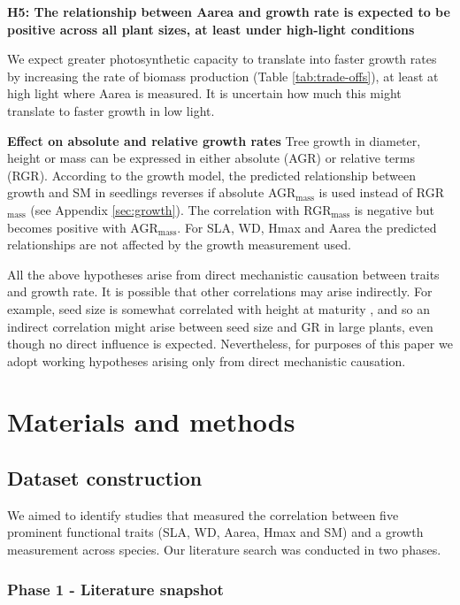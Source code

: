 \documentclass[a4paper,11pt]{article}
\begin{document}
\textbf{H5: The relationship between Aarea and growth rate is expected to be positive across all plant sizes, at least under high-light conditions}

We expect greater photosynthetic capacity to translate into faster growth rates by increasing the rate of biomass production (Table \ref{tab:trade-offs}), at least at high light where Aarea is measured. It is uncertain how much this might translate to faster growth in low light.

\textbf{Effect on absolute and relative growth rates}
Tree growth in diameter, height or mass can be expressed in either absolute (AGR) or relative terms (RGR). According to the growth model, the predicted relationship between growth and SM in seedlings reverses if absolute AGR$_\textrm{mass}$ is used instead of RGR$_\textrm{mass}$ (see Appendix \ref{sec:growth}). The correlation with RGR$_\textrm{mass}$ is negative but becomes positive with AGR$_\textrm{mass}$. For SLA, WD, Hmax and Aarea the predicted relationships are not affected by the growth measurement used. 

All the above hypotheses arise from direct mechanistic causation between traits and growth rate. It is possible that other correlations may arise indirectly. For example, seed size is somewhat correlated with height at maturity \citep{Westoby:2009ch}, and so an indirect correlation might arise between seed size and GR in large plants, even though no direct influence is expected. Nevertheless, for purposes of this paper we adopt working hypotheses arising only from direct mechanistic causation. 

\section*{Materials and methods}\label{material-and-methods}

\subsection*{Dataset construction}\label{data-construction}

We aimed to identify studies that measured the correlation between five prominent functional traits (SLA, WD, Aarea, Hmax and SM) and a growth measurement across species. Our literature search was conducted in two phases.

\subsubsection*{Phase 1 - Literature snapshot}\label{literature-snapshot}
\end{document}
